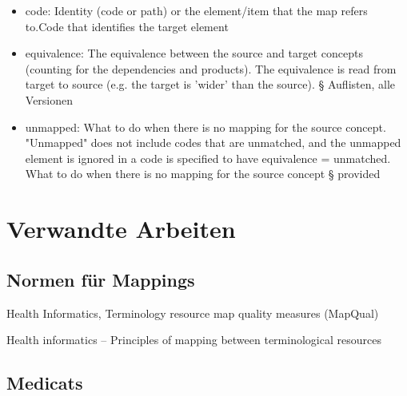 \begin{itemize}
\item code: Identity (code or path) or the element/item that the map refers to.\newline Code that identifies the target element
\item equivalence: The equivalence between the source and target concepts (counting for the dependencies and products). The equivalence is read from target to source (e.g. the target is 'wider' than the source). \newline § Auflisten, alle Versionen
\item unmapped: What to do when there is no mapping for the source concept. "Unmapped" does not include codes that are unmatched, and the unmapped element is ignored in a code is specified to have equivalence = unmatched. \newline What to do when there is no mapping for the source concept \newline § provided
\end{itemize}

\section{Verwandte Arbeiten}
\subsection{Normen für Mappings}

Health Informatics, Terminology resource map quality measures (MapQual) \cite{ISO21564}


Health informatics -- Principles of mapping between terminological resources \cite{ISO12300}

\subsection{Medicats}

\begin{comment}
\bibitem{Medicats}
Medicats Library \newline
\url{https://github.com/hhund/medicats}

\bibitem{Medicats Thesis}
``Medical Classification and Terminology Systems in a Secondary Use Context: Challenges and Perils'' \newline
\url{https://www.researchgate.net/publication/320962066_Medical_Classification_and_Terminology_Systems_in_a_Secondary_Use_Context_Challenges_and_Perils}
\end{comment}

